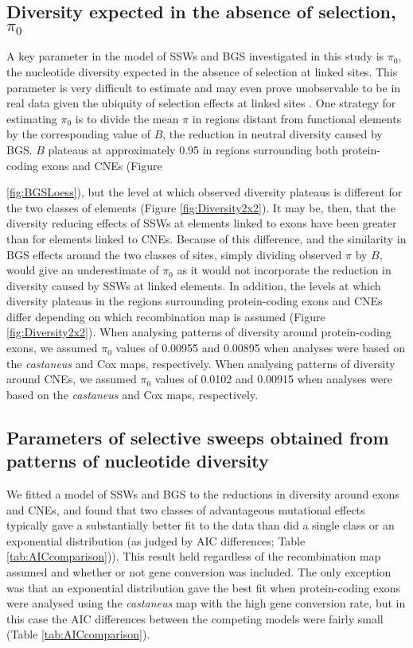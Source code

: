 \subsection{Diversity expected in the absence of selection, $\pi_0$}

	A key parameter in the model of SSWs and BGS investigated in this study is $\pi_0$, the nucleotide diversity expected in the absence of selection at linked sites. This parameter is very difficult to estimate and may even prove unobservable to be in real data given the ubiquity of selection effects at linked sites \citep{RN357}. One strategy for estimating $\pi_0$ is to divide the mean $\pi$ in regions distant from functional elements by the corresponding value of $B$, the reduction in neutral diversity caused by BGS. $B$ plateaus at approximately 0.95 in regions surrounding both protein-coding exons and CNEs (Figure {\ref{fig:BGSLoess}), but the level at which observed diversity plateaus is different for the two classes of elements (Figure \ref{fig:Diversity2x2}). It may be, then, that the diversity reducing effects of SSWs at elements linked to exons have been greater than for elements linked to CNEs. Because of this difference, and the similarity in BGS effects around the two classes of sites, simply dividing observed $\pi$ by $B$, would give an underestimate of $\pi_0$ as it would not incorporate the reduction in diversity caused by SSWs at linked elements. In addition, the levels at which diversity plateaus in the regions surrounding protein-coding exons and CNEs differ depending on which recombination map is assumed (Figure \ref{fig:Diversity2x2}).	When analysing patterns of diversity around protein-coding exons, we assumed $\pi_0$ values of 0.00955 and 0.00895 when analyses were based on the \textit{castaneus} and Cox maps, respectively. When analysing patterns of diversity around CNEs, we assumed $\pi_0$ values of 0.0102 and 0.00915 when analyses were based on the \textit{castaneus} and Cox maps, respectively.

\subsection{Parameters of selective sweeps obtained from patterns of nucleotide diversity}

	We fitted a model of SSWs and BGS to the reductions in diversity around exons and CNEs, and found that two classes of advantageous mutational effects typically gave a substantially better fit to the data than did a single class or an exponential distribution (as judged by AIC differences; Table \ref{tab:AICcomparison})). This result held regardless of the recombination map assumed and whether or not gene conversion was included. The only exception was that an exponential distribution gave the best fit when protein-coding exons were analysed using the \textit{castaneus} map with the high gene conversion rate, but in this case the AIC differences between the competing models were fairly small (Table \ref{tab:AICcomparison}).
	
}

